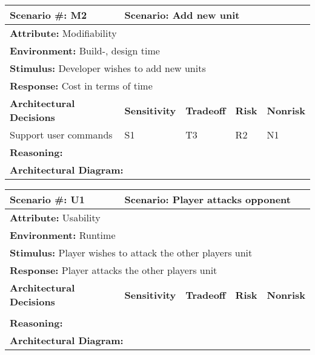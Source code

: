 \begin{tabular}{|m{}|m{}|m{}
|m{}|m{}|m{}|}
  \hline
  {\bf Scenario \#:} M2 & \multicolumn{5}{m{0.75 \textwidth}|}{{\bf Scenario:}
  Add new unit} \\ \hline
  \multicolumn{6}{|m{0.9 \textwidth}|}{{\bf Attribute:} Modifiability}
  \\ \hline
  \multicolumn{6}{|m{0.9 \textwidth}|}{{\bf Environment:} Build-, design time}
  \\ \hline
  \multicolumn{6}{|m{0.9 \textwidth}|}{{\bf Stimulus:} Developer wishes to add
  new units} \\ \hline
  \multicolumn{6}{|m{0.9 \textwidth}|}{{\bf Response:} Cost in terms of time}
  \\ \hline
  \multicolumn{2}{|m{0.3 \textwidth}|}{\bf Architectural Decisions} &
  {\bf Sensitivity} & {\bf Tradeoff} & {\bf Risk} & {\bf Nonrisk} \\ \hline
  \multicolumn{2}{|m{0.3 \textwidth}|}{Support user commands} & S1 & T3 & R2 &
  N1 \\ \hline
  \multicolumn{6}{|m{0.9 \textwidth}|}{{\bf Reasoning:} } \\ \hline
  \multicolumn{6}{|m{0.9 \textwidth}|}{{\bf Architectural Diagram:} } \\ \hline
\end{tabular}

\begin{tabular}{|m{}|m{}|m{}
|m{}|m{}|m{}|}
  \hline
  {\bf Scenario \#:} U1 & \multicolumn{5}{m{0.75 \textwidth}|}{{\bf Scenario:}
  Player attacks opponent} \\ \hline
  \multicolumn{6}{|m{0.9 \textwidth}|}{{\bf Attribute:} Usability} \\ \hline
  \multicolumn{6}{|m{0.9 \textwidth}|}{{\bf Environment:} Runtime} \\ \hline
  \multicolumn{6}{|m{0.9 \textwidth}|}{{\bf Stimulus:} Player wishes to attack
  the other players unit} \\ \hline
  \multicolumn{6}{|m{0.9 \textwidth}|}{{\bf Response:} Player attacks the other
  players unit} \\ \hline
  \multicolumn{2}{|m{0.3 \textwidth}|}{\bf Architectural Decisions} &
  {\bf Sensitivity} & {\bf Tradeoff} & {\bf Risk} & {\bf Nonrisk} \\ \hline
  \multicolumn{2}{|m{0.3 \textwidth}|}{} &  &  &  &  \\ \hline
  \multicolumn{6}{|m{0.9 \textwidth}|}{{\bf Reasoning:} } \\ \hline
  \multicolumn{6}{|m{0.9 \textwidth}|}{{\bf Architectural Diagram:} } \\ \hline
\end{tabular}

